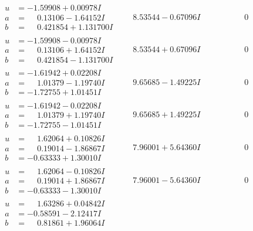 \documentclass[1p]{elsarticle_modified}
\theoremstyle{definition}
\begin{document}
$$\begin{array}{c|c|c}
\begin{aligned}
u &= -1.59908 + 0.00978 I \\
a &= \phantom{-}0.13106 - 1.64152 I \\
b &= \phantom{-}0.421854 + 1.131700 I\end{aligned}
 & \phantom{-}8.53544 - 0.67096 I & \phantom{-0.000000 } 0 \\ \hline\begin{aligned}
u &= -1.59908 - 0.00978 I \\
a &= \phantom{-}0.13106 + 1.64152 I \\
b &= \phantom{-}0.421854 - 1.131700 I\end{aligned}
 & \phantom{-}8.53544 + 0.67096 I & \phantom{-0.000000 } 0 \\ \hline\begin{aligned}
u &= -1.61942 + 0.02208 I \\
a &= \phantom{-}1.01379 - 1.19740 I \\
b &= -1.72755 + 1.01451 I\end{aligned}
 & \phantom{-}9.65685 - 1.49225 I & \phantom{-0.000000 } 0 \\ \hline\begin{aligned}
u &= -1.61942 - 0.02208 I \\
a &= \phantom{-}1.01379 + 1.19740 I \\
b &= -1.72755 - 1.01451 I\end{aligned}
 & \phantom{-}9.65685 + 1.49225 I & \phantom{-0.000000 } 0 \\ \hline\begin{aligned}
u &= \phantom{-}1.62064 + 0.10826 I \\
a &= \phantom{-}0.19014 - 1.86867 I \\
b &= -0.63333 + 1.30010 I\end{aligned}
 & \phantom{-}7.96001 + 5.64360 I & \phantom{-0.000000 } 0 \\ \hline\begin{aligned}
u &= \phantom{-}1.62064 - 0.10826 I \\
a &= \phantom{-}0.19014 + 1.86867 I \\
b &= -0.63333 - 1.30010 I\end{aligned}
 & \phantom{-}7.96001 - 5.64360 I & \phantom{-0.000000 } 0 \\ \hline\begin{aligned}
u &= \phantom{-}1.63286 + 0.04842 I \\
a &= -0.58591 - 2.12417 I \\
b &= \phantom{-}0.81861 + 1.96064 I\end{aligned}

\end{array}$$
\end{document}
